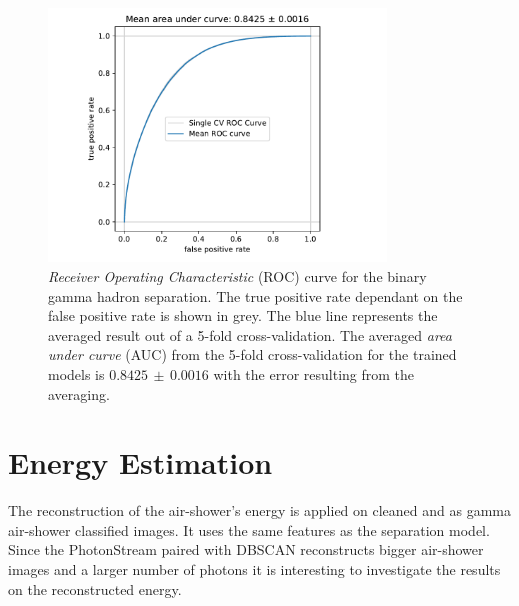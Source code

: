 \begin{figure}
  \centering
  \includegraphics[width=0.8\textwidth, page=1]{Plots/results/DBSCAN/separation_performance.pdf}
  \caption{\textit{Receiver Operating Characteristic} (ROC) curve for the binary gamma hadron separation. The true positive rate dependant on the false positive rate is shown in grey. The blue line represents the averaged result out of a 5-fold cross-validation. The averaged \textit{area under curve} (AUC) from the 5-fold cross-validation for the trained models is $0.8425\,\pm\,0.0016$ with the error resulting from the averaging.}
  \label{fig:sep_auc}
\end{figure}
%
%
%
\section{Energy Estimation}
%
The reconstruction of the air-shower's energy is applied on cleaned and as
gamma air-shower classified images. It uses the same features as the separation
model. Since the PhotonStream paired with DBSCAN reconstructs bigger air-shower
images and a larger number of photons it is interesting to investigate the
results on the reconstructed energy.

